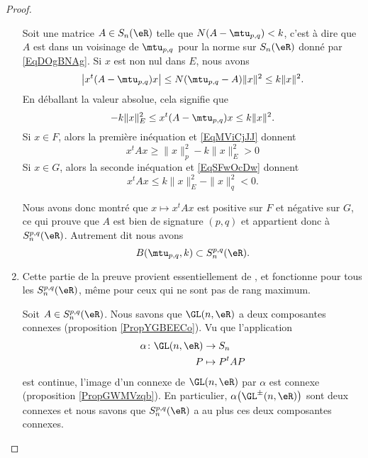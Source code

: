 \begin{proof}
\begin{enumerate}
            Soit une matrice \( A\in S_n(\eR)\) telle que \( N(A-\mtu_{p,q})<k\), c'est à dire que \( A\) est dans un voisinage de \( \mtu_{p,q}\) pour la norme sur \( S_n(\eR)\) donné par \eqref{EqDOgBNAg}. Si \( x\) est non nul dans \( E\), nous avons
            \begin{equation}
                \big| x^t(A-\mtu_{p,q})x \big|\leq N(\mtu_{p,q}-A)\| x \|^2\leq k\| x \|^2.
            \end{equation}
            En déballant la valeur absolue, cela signifie que
            \begin{equation}
                -k\| x \|_E^2\leq x^t(A-\mtu_{p,q})x\leq k\| x \|^2.
            \end{equation}
            Si \( x\in F\), alors la première inéquation et \eqref{EqMViCjJJ} donnent
            \begin{equation}
                x^tAx\geq \| x \|_p^2-k\| x \|_E^2>0
            \end{equation}
            Si \( x\in G\), alors la seconde inéquation et \eqref{EqSFwOcDw} donnent
            \begin{equation}
                x^tAx\leq  k\| x \|_E^2-\| x \|_q^2<0.
            \end{equation}
            
            Nous avons donc montré que \( x\mapsto x^tAx\) est positive sur \( F\) et négative sur \( G\), ce qui prouve que \( A\) est bien de signature \( (p,q)\) et appartient donc à \( S_n^{p,q}(\eR)\). Autrement dit nous avons
            \begin{equation}
                B(\mtu_{p,q},k)\subset S_n^{p,q}(\eR).
            \end{equation}

        \item
            Cette partie de la preuve provient essentiellement de \cite{VKqpMYL}, et fonctionne pour tous les \( S_n^{p,q}(\eR)\), même pour ceux qui ne sont pas de rang maximum. 
            
            Soit \( A\in S_n^{p,q}(\eR)\). Nous savons que \( \GL(n,\eR)\) a deux composantes connexes (proposition \ref{PropYGBEECo}). Vu que l'application 
            \begin{equation}
                \begin{aligned}
                    \alpha\colon \GL(n,\eR)&\to S_n \\
                    P&\mapsto P^tAP 
                \end{aligned}
            \end{equation}
            est continue, l'image d'un connexe de \( \GL(n,\eR)\) par \( \alpha\) est connexe (proposition \ref{PropGWMVzqb}). En particulier, \( \alpha\big( \GL^{\pm}(n,\eR) \big)\) sont deux connexes et nous savons que \( S_n^{p,q}(\eR)\) a au plus ces deux composantes connexes. 


\end{enumerate}
\end{proof}
